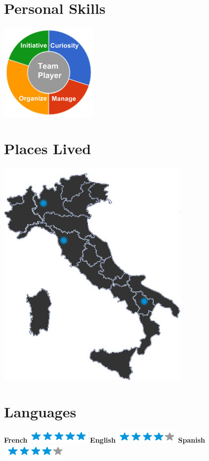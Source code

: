 \documentclass[]{friggeri-cv}
\begin{document}
\begin{aside}
~
~
~
  \section{Personal Skills}
    \includegraphics[scale=0.62]{img/personal.png}
    ~
  \section{Places Lived}
    \includegraphics[scale=0.25]{img/italia.png}
    ~
  \section{Languages}
    \textbf{French}\includegraphics[scale=0.40]{img/5stars.png}
    \textbf{English}\includegraphics[scale=0.40]{img/4stars.png}
    \textbf{Spanish}\includegraphics[scale=0.40]{img/4stars.png}
\end{aside}
\end{document}
